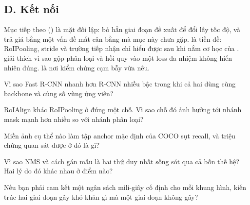 \documentclass[../../../deep_learning.tex]{subfiles}
\begin{document}
\subsection{D. Kết nối}
Mục tiếp theo () là mặt đối lập: bỏ hẳn giai đoạn đề xuất để đổi lấy tốc độ, và trả giá bằng một vấn đề mất cân bằng mà mục này chưa gặp.  là tiền đề: RoIPooling, stride và trường tiếp nhận chỉ hiểu được sau khi nắm cơ học của .  giải thích vì sao gộp phân loại và hồi quy vào một loss đa nhiệm không hiển nhiên đúng.  là nơi kiểm chứng cạm bẫy vừa nêu.

\begin{tukiem}
\item Vì sao Fast R-CNN nhanh hơn R-CNN nhiều bậc trong khi cả hai dùng cùng backbone và cùng số vùng ứng viên?
\item RoIAlign khác RoIPooling ở đúng một chỗ. Vì sao chỗ đó ảnh hưởng tới nhánh mask mạnh hơn nhiều so với nhánh phân loại?
\item Miền ảnh cụ thể nào làm tập anchor mặc định của COCO sụt recall, và triệu chứng quan sát được ở đó là gì?
\item Vì sao NMS và cách gán mẫu là hai thứ duy nhất sống sót qua cả bốn thế hệ? Hai lý do đó khác nhau ở điểm nào?
\item Nếu bạn phải cam kết một ngân sách mili-giây cố định cho mỗi khung hình, kiến trúc hai giai đoạn gây khó khăn gì mà một giai đoạn không gây?
\end{tukiem}
\ifSubfilesClassLoaded{\printbibliography[title={Nguồn}]}{}
\end{document}
